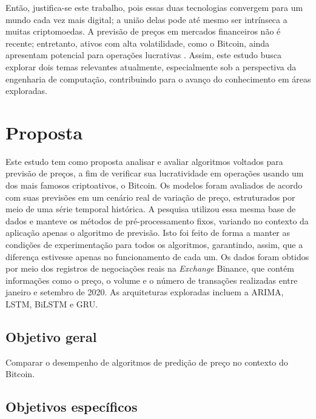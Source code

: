 Então, justifica-se este trabalho, pois essas duas tecnologias convergem
para um mundo cada vez mais digital; a união delas pode até mesmo ser intrínseca a muitas criptomoedas.
A previsão de preços em mercados financeiros não é recente; entretanto, ativos com alta volatilidade, como o Bitcoin, ainda apresentam potencial para operações lucrativas \cite{Tri}.
Assim, este estudo busca explorar dois temas relevantes atualmente, especialmente sob a perspectiva da engenharia de computação, contribuindo para o avanço do conhecimento em áreas exploradas.


\section{Proposta}

Este estudo tem como proposta analisar e avaliar algoritmos voltados para previsão de preços, a fim de verificar sua lucratividade em operações usando um dos mais famosos criptoativos, o Bitcoin.
Os modelos foram avaliados de acordo com suas previsões em um cenário real de variação de preço, estruturados por meio de uma série temporal histórica. A pesquisa utilizou essa mesma base de dados e manteve os métodos de pré-processamento fixos, variando no contexto da aplicação apenas o algoritmo de previsão.
Isto foi feito de forma a manter as condições de experimentação para todos os algoritmos, garantindo, assim, que a diferença estivesse apenas no funcionamento de cada um.
Os dados foram obtidos por meio dos registros de negociações reais na \textit{Exchange}
 Binance, que contém informações como o preço, o volume e o número de transações realizadas entre janeiro e setembro de 2020.
As arquiteturas exploradas incluem a ARIMA, LSTM, BiLSTM e GRU.

\subsection{Objetivo geral}

Comparar o desempenho de algoritmos de predição de preço no contexto do Bitcoin.

\subsection{Objetivos específicos}


